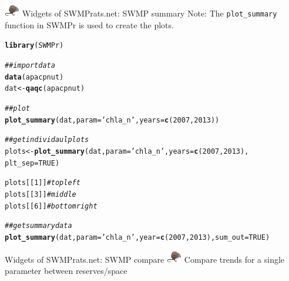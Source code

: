 \documentclass[xcolor=dvipsnames,serif]{beamer}\usepackage[]{graphicx}\usepackage[]{color}
\makeatletter
\newcommand{\hlnum}[1]{\textcolor[rgb]{0.686,0.059,0.569}{#1}}%
\newcommand{\hlstr}[1]{\textcolor[rgb]{0.192,0.494,0.8}{#1}}%
\newcommand{\hlcom}[1]{\textcolor[rgb]{0.678,0.584,0.686}{\textit{#1}}}%
\newcommand{\hlstd}[1]{\textcolor[rgb]{0.345,0.345,0.345}{#1}}%
\newcommand{\hlkwb}[1]{\textcolor[rgb]{0.69,0.353,0.396}{#1}}%
\newcommand{\hlkwc}[1]{\textcolor[rgb]{0.333,0.667,0.333}{#1}}%
\newcommand{\hlkwd}[1]{\textcolor[rgb]{0.737,0.353,0.396}{\textbf{#1}}}%
\newenvironment{kframe}{%
 \def\at@end@of@kframe{}%
 \ifinner\ifhmode%
  \def\at@end@of@kframe{\end{minipage}}%
  \begin{minipage}{\columnwidth}%
 \fi\fi%
 \def\FrameCommand##1{\hskip\@totalleftmargin \hskip-\fboxsep
 \colorbox{shadecolor}{##1}\hskip-\fboxsep
     \hskip-\linewidth \hskip-\@totalleftmargin \hskip\columnwidth}%
 \MakeFramed {\advance\hsize-\width
   \@totalleftmargin\z@ \linewidth\hsize
   \@setminipage}}%
 {\par\unskip\endMakeFramed%
 \at@end@of@kframe}
\newenvironment{knitrout}{}{} %
\makeatother
\begin{document}
\begin{frame}[fragile]{\includegraphics[width = 0.05\textwidth]{imgs/swmprat.png} Widgets of SWMPrats.net: SWMP summary}
Note: The \texttt{plot\_summary} function in SWMPr is used to create the plots.
\begin{knitrout}\scriptsize
{}\color{fgcolor}\begin{kframe}
\begin{alltt}
\hlkwd{library}\hlstd{(SWMPr)}

\hlcom{## import data}
\hlkwd{data}\hlstd{(apacpnut)}
\hlstd{dat} \hlkwb{<-} \hlkwd{qaqc}\hlstd{(apacpnut)}

\hlcom{## plot}
\hlkwd{plot_summary}\hlstd{(dat,} \hlkwc{param} \hlstd{=} \hlstr{'chla_n'}\hlstd{,} \hlkwc{years} \hlstd{=} \hlkwd{c}\hlstd{(}\hlnum{2007}\hlstd{,} \hlnum{2013}\hlstd{))}

\hlcom{## get individaul plots}
\hlstd{plots} \hlkwb{<-} \hlkwd{plot_summary}\hlstd{(dat,} \hlkwc{param} \hlstd{=} \hlstr{'chla_n'}\hlstd{,} \hlkwc{years} \hlstd{=} \hlkwd{c}\hlstd{(}\hlnum{2007}\hlstd{,} \hlnum{2013}\hlstd{),}
  \hlkwc{plt_sep} \hlstd{=} \hlnum{TRUE}\hlstd{)}

\hlstd{plots[[}\hlnum{1}\hlstd{]]} \hlcom{# top left}
\hlstd{plots[[}\hlnum{3}\hlstd{]]} \hlcom{# middle}
\hlstd{plots[[}\hlnum{6}\hlstd{]]} \hlcom{# bottom right}

\hlcom{## get summary data}
\hlkwd{plot_summary}\hlstd{(dat,} \hlkwc{param} \hlstd{=} \hlstr{'chla_n'}\hlstd{,} \hlkwc{year} \hlstd{=} \hlkwd{c}\hlstd{(}\hlnum{2007}\hlstd{,} \hlnum{2013}\hlstd{),} \hlkwc{sum_out} \hlstd{=} \hlnum{TRUE}\hlstd{)}
\end{alltt}
\end{kframe}
\end{knitrout}
\end{frame}

\begin{frame}{Widgets of SWMPrats.net: SWMP compare}
\includegraphics[width = 0.05\textwidth]{imgs/swmprat.png} Compare trends for a single parameter between reserves/space
\centerline{}
\end{frame}
\end{document}

